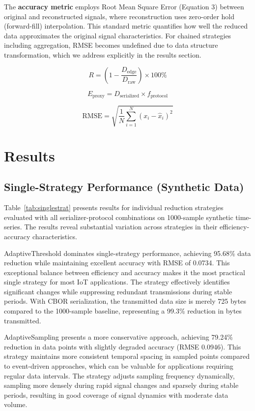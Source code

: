 \documentclass[10pt,twocolumn]{article}
\begin{document}
The \textbf{accuracy metric} employs Root Mean Square Error (Equation 3) between original and reconstructed signals, where reconstruction uses zero-order hold (forward-fill) interpolation. This standard metric quantifies how well the reduced data approximates the original signal characteristics. For chained strategies including aggregation, RMSE becomes undefined due to data structure transformation, which we address explicitly in the results section.

\begin{equation}
R = \left(1 - \frac{D_{\text{edge}}}{D_{\text{raw}}}\right) \times 100\%
\end{equation}

\begin{equation}
E_{\text{proxy}} = D_{\text{serialized}} \times f_{\text{protocol}}
\end{equation}

\begin{equation}
\text{RMSE} = \sqrt{\frac{1}{N}\sum_{i=1}^{N}(x_i - \hat{x}_i)^2}
\end{equation}

\section{Results}

\subsection{Single-Strategy Performance (Synthetic Data)}

Table~\ref{tab:singlestrat} presents results for individual reduction strategies evaluated with all serializer-protocol combinations on 1000-sample synthetic time-series. The results reveal substantial variation across strategies in their efficiency-accuracy characteristics.

AdaptiveThreshold dominates single-strategy performance, achieving 95.68\% data reduction while maintaining excellent accuracy with RMSE of 0.0734. This exceptional balance between efficiency and accuracy makes it the most practical single strategy for most IoT applications. The strategy effectively identifies significant changes while suppressing redundant transmissions during stable periods. With CBOR serialization, the transmitted data size is merely 725 bytes compared to the 1000-sample baseline, representing a 99.3\% reduction in bytes transmitted.

AdaptiveSampling presents a more conservative approach, achieving 79.24\% reduction in data points with slightly degraded accuracy (RMSE 0.0946). This strategy maintains more consistent temporal spacing in sampled points compared to event-driven approaches, which can be valuable for applications requiring regular data intervals. The strategy adjusts sampling frequency dynamically, sampling more densely during rapid signal changes and sparsely during stable periods, resulting in good coverage of signal dynamics with moderate data volume.
\end{document}
